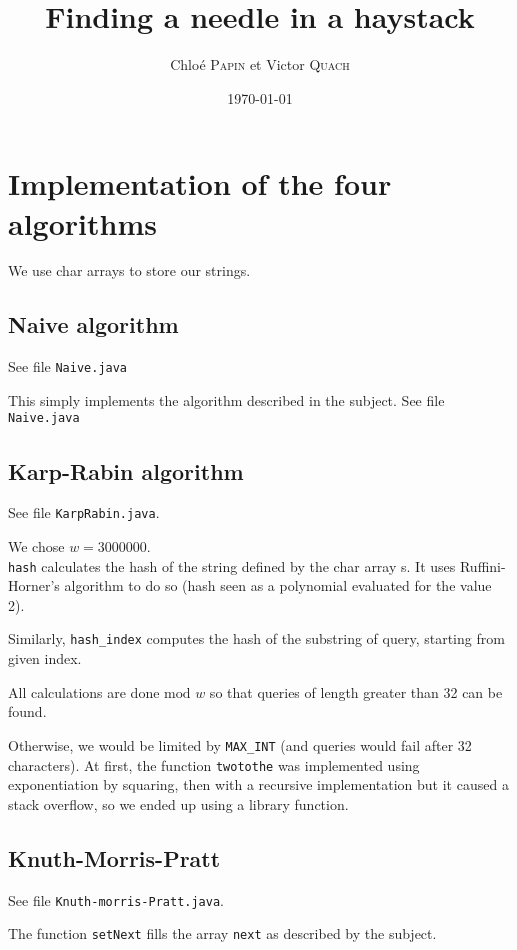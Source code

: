 \documentclass[a4paper,11pt]{article}
\title{Finding a needle in a haystack}
\author{Chloé \textsc{Papin} et Victor \textsc{Quach}}
\date{\today{}}
\begin{document}
\maketitle
	
\section{Implementation of the four algorithms}

We use char arrays to store our strings. 

\subsection{Naive algorithm}
See file \nolinkurl{Naive.java}

This simply implements the algorithm described in the subject. See file \nolinkurl{Naive.java}

\subsection{Karp-Rabin algorithm}

See file \nolinkurl{KarpRabin.java}.

We chose $ w = 3000000$.\\



\nolinkurl{hash} calculates the hash of the string defined by the char array s. It uses Ruffini-Horner's algorithm to do so (hash seen as a polynomial evaluated for the value 2).

Similarly, \nolinkurl{hash_index}  computes the hash of the substring of query, starting from given index. 

All calculations are done $\text{mod } w $ so that queries of length greater than 32 can be found.

 Otherwise, we would be limited by \nolinkurl{MAX_INT} (and queries would fail after 32 characters). At first, the function \nolinkurl{twotothe} was implemented using exponentiation by squaring, then with a recursive implementation but it caused a stack overflow, so we ended up using a library function.


\subsection{Knuth-Morris-Pratt}

See file \nolinkurl{Knuth-morris-Pratt.java}.

The function \nolinkurl{setNext} fills the array \nolinkurl{next} as described by the subject.
\end{document}

